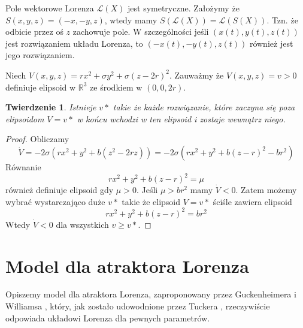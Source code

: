 \documentclass[12pt]{report}
\newtheorem{theorem}{Twierdzenie}
\newcommand{\R}{\mathbb{R}}
\begin{document}
	\par Pole wektorowe Lorenza $\mathcal{L}(X)$ jest symetryczne. Założymy że $S(x, y, z) = (-x, -y, z)$, wtedy mamy $S(\mathcal{L}(X)) = \mathcal{L}(S(X))$. Tzn. że odbicie przez oś $z$ zachowuje pole. W szczególności jeśli $(x(t), y(t), z(t))$ jest rozwiązaniem układu Lorenza, to $(-x(t), -y(t), z(t))$ również jest jego rozwiązaniem.
	\\
	\par Niech $V(x, y, z) = rx^2 + \sigma y^2 + \sigma (z - 2r)^2$. Zauważmy że $V(x, y, z) = v > 0$ definiuje elipsoid w $\R^3$ ze środkiem w $(0, 0, 2r)$.
	\begin{theorem}
		Istnieje $v*$ takie że każde rozwiązanie, które zaczyna się poza elipsoidom $V = v*$ w końcu wchodzi w ten elipsoid i zostaje wewnątrz niego.
	\end{theorem}
	\begin{proof}
		Obliczamy
			\[ \dot{V} = -2 \sigma (rx^2 + y^2 + b(z^2 - 2rz)) = -2 \sigma (rx^2 + y^2 + b(z - r)^2 - br^2) \]
		Równanie
			\[ rx^2 + y^2 + b(z - r)^2 = \mu \]
		również definiuje elipsoid gdy $\mu > 0$. Jeśli $\mu > br^2$ mamy $\dot{V} < 0$. Zatem możemy wybrać wystarczająco duże $v*$ takie że elipsoid $V = v*$ ściśle zawiera elipsoid
			\[ rx^2 + y^2 + b(z - r)^2 = br^2 \]
		Wtedy $\dot{V} < 0$ dla wszystkich $v \ge v*$.
	\end{proof}

	\section{Model dla atraktora Lorenza}
	\par Opiszemy model dla atraktora Lorenza, zaproponowany przez Guckenheimera i Williamsa \cite{GW}, który, jak zostało udowodnione przez Tuckera \cite{Tucker}, rzeczywiście odpowiada układowi Lorenza dla pewnych parametrów.
	
\end{document}
